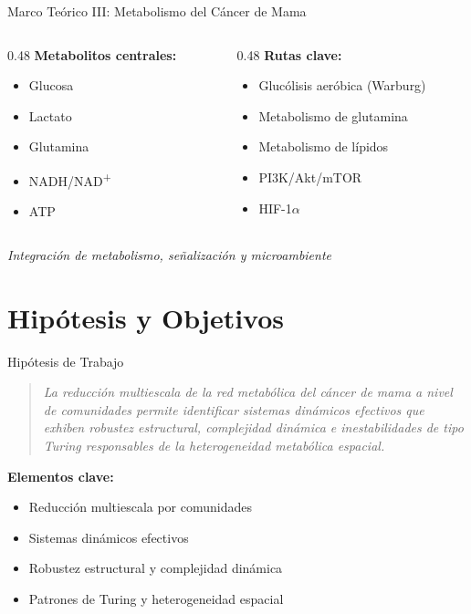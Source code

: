 \documentclass[aspectratio=169, 11pt]{beamer}
\begin{document}
	\begin{frame}{Marco Teórico III: Metabolismo del Cáncer de Mama}
		\begin{columns}
			\begin{column}{0.48\textwidth}
				\textbf{Metabolitos centrales:}
				\begin{itemize}
					\item Glucosa
					\item Lactato
					\item Glutamina
					\item NADH/NAD\textsuperscript{+}
					\item ATP
				\end{itemize}
			\end{column}
			\begin{column}{0.48\textwidth}
				\textbf{Rutas clave:}
				\begin{itemize}
					\item Glucólisis aeróbica (Warburg)
					\item Metabolismo de glutamina
					\item Metabolismo de lípidos
					\item PI3K/Akt/mTOR
					\item HIF-1$\alpha$
				\end{itemize}
			\end{column}
		\end{columns}
		
		\vspace{0.3cm}
		\centering
		\footnotesize \textit{Integración de metabolismo, señalización y microambiente}
	\end{frame}
	
	\section{Hipótesis y Objetivos}
	\begin{frame}{Hipótesis de Trabajo}
		\begin{quote}
			\emph{La reducción multiescala de la red metabólica del cáncer de mama a nivel de comunidades permite identificar sistemas dinámicos efectivos que exhiben robustez estructural, complejidad dinámica e inestabilidades de tipo Turing responsables de la heterogeneidad metabólica espacial.}
		\end{quote}
		
		\vspace{0.5cm}
		\centering
		\textbf{Elementos clave:}
		\begin{itemize}
			\item Reducción multiescala por comunidades
			\item Sistemas dinámicos efectivos
			\item Robustez estructural y complejidad dinámica
			\item Patrones de Turing y heterogeneidad espacial
		\end{itemize}
	\end{frame}
	
\end{document}
